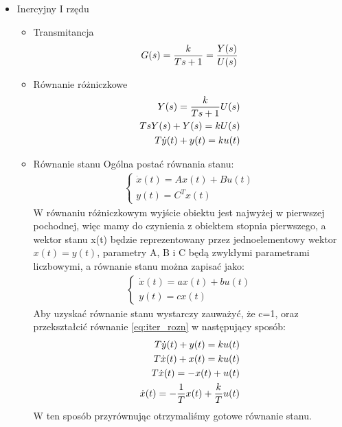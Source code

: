 \documentclass[a4paper,10pt]{article}
\begin{document}
\begin{itemize}
\item Inercyjny I rzędu

\begin{itemize}
\item Transmitancja	
	\begin{eqnarray}
		G(s)= {k \over {Ts + 1}} = {Y(s) \over U(s)}
	\end{eqnarray}
\item Równanie różniczkowe
	\begin{eqnarray}
		\nonumber Y(s) = {k \over {Ts + 1}} U(s)\\ 
		\nonumber TsY(s) + Y(s) = kU(s)\\
		T\dot{y}(t) + y(t) = ku(t) \label{eq:iter_rozn}
	\end{eqnarray}
\item Równanie stanu
\newline Ogólna postać równania stanu:
	\begin{eqnarray}
		\nonumber \left\{ \begin{array}{l}
			\dot{x}(t) = Ax(t) + Bu(t)\\
			y(t) = C^{T}x(t)
		\end{array} \right.
	\end{eqnarray}
W równaniu różniczkowym wyjście obiektu jest najwyżej w pierwszej pochodnej, więc mamy do czynienia z obiektem stopnia pierwszego, a wektor stanu x(t) będzie reprezentowany przez jednoelementowy wektor $x(t) = y(t)$, parametry A, B i C będą zwykłymi parametrami liczbowymi, a równanie stanu można zapisać jako:
	\begin{eqnarray}
		\nonumber \left\{ \begin{array}{l}
			\dot{x}(t) = ax(t) + bu(t)\\
			y(t) = cx(t)
		\end{array} \right.
	\end{eqnarray}
Aby uzyskać równanie stanu wystarczy zauważyć, że c=1, oraz przekształcić równanie \ref{eq:iter_rozn} w następujący sposób:
	\begin{eqnarray}
		\nonumber T\dot{y}(t) + y(t) = ku(t)\\
		\nonumber T\dot{x}(t) + x(t) = ku(t)\\
		\nonumber T\dot{x}(t) = - x(t) + u(t)\\
		\dot{x}(t) = -{1 \over T}x(t) + {k \over T}u(t)
	\end{eqnarray}
W ten sposób przyrównując otrzymaliśmy gotowe równanie stanu.
	\begin{eqnarray}

\end{eqnarray}
\end{itemize}
\end{itemize}
\end{document}
